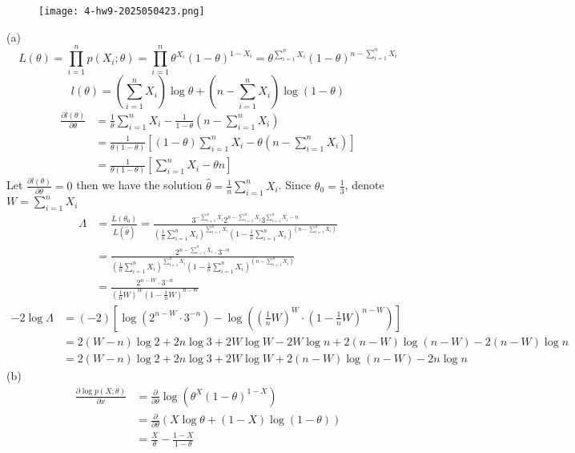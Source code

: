 \begin{exercise}
\begin{figure}[H]
\centering
\texttt{[image: 4-hw9-2025050423.png]}
\label{}
\end{figure}
\end{exercise}
(a)
\[
L(\theta)=\prod_{i=1}^{n} p(X_i;\theta)=\prod_{i=1}^{n} \theta^{X_i}(1-\theta)^{1-X_i}=\theta^{\sum_{i=1}^{n} X_i}(1-\theta)^{n-\sum_{i=1}^{n} X_i}
\]
\[
l(\theta)=\left( \sum_{i=1}^{n} X_i \right)\log\theta+\left( n-\sum_{i=1}^{n} X_i \right)\log(1-\theta)
\]
\[
\begin{aligned}
\frac{ \partial l(\theta) }{ \partial \theta }  & =\frac{1}{\theta}\sum_{i=1}^{n} X_i-\frac{1}{1-\theta}\left( n-\sum_{i=1}^{n} X_i \right) \\
 & =\frac{1}{\theta(1-\theta)}\left[ (1-\theta)\sum_{i=1}^{n} X_i-\theta\left( n-\sum_{i=1}^{n} X_i  \right) \right] \\
 & =\frac{1}{\theta(1-\theta)}\left[ \sum_{i=1}^{n} X_i-\theta n \right]
\end{aligned}
\]
Let $\frac{ \partial l(\theta) }{ \partial \theta }=0$ then we have the solution $\widehat{\theta}=\frac{1}{n}\sum_{i=1}^{n}X_i$. Since $\theta_0=\frac{1}{3}$, denote $W=\sum_{i=1}^{n}X_i$
\[
\begin{aligned}
\Lambda & =\frac{L(\theta_0)}{L(\widehat{\theta})}=\frac{3^{-\sum_{i=1}^{n} X_i}2^{n-\sum_{i=1}^{n}X_i }3^{\sum_{i=1}^{n} X_i-n}}{\left( \frac{1}{n}\sum_{i=1}^{n} X_i \right)^{\sum_{i=1}^{n} X_i}\left( 1-\frac{1}{n}\sum_{i=1}^{n} X_i \right)^{\left( n-\sum_{i=1}^{n} X_i \right)}} \\
 & =\frac{2^{n-\sum_{i=1}^{n}X_i }\cdot 3^{-n}}{\left( \frac{1}{n}\sum_{i=1}^{n} X_i \right)^{\sum_{i=1}^{n} X_i}\left( 1-\frac{1}{n}\sum_{i=1}^{n} X_i \right)^{\left( n-\sum_{i=1}^{n} X_i \right)}} \\
 & =\frac{2^{n-W}\cdot3^{-n}}{\left( \frac{1}{n}W \right)^{W}\left( 1-\frac{1}{n}W \right)^{n-W}}
\end{aligned}
\]
\[
\begin{aligned}
-2\log\Lambda & =(-2)\left[ \log(2^{n-W}\cdot3^{-n})-\log\left( \left( \frac{1}{n}W \right)^{W}\cdot\left( 1-\frac{1}{n}W \right)^{n-W} \right) \right] \\
 & =2(W-n)\log2+2n\log3+2W\log W-2W\log n+2(n-W)\log(n-W)-2(n-W)\log n \\
 & =2(W-n)\log2+2n\log3+2W\log W+2(n-W)\log(n-W)-2n\log n
\end{aligned}
\]
(b)
\[
\begin{aligned}
\frac{ \partial \log p(X;\theta) }{ \partial x }  & =\frac{ \partial   }{ \partial \theta } \log(\theta^{X}(1-\theta )^{1-X}) \\
 & =\frac{ \partial   }{ \partial \theta } (X\log\theta+(1-X)\log(1-\theta)) \\
 & =\frac{X}{\theta}-\frac{1-X}{1-\theta}
\end{aligned}
\]
